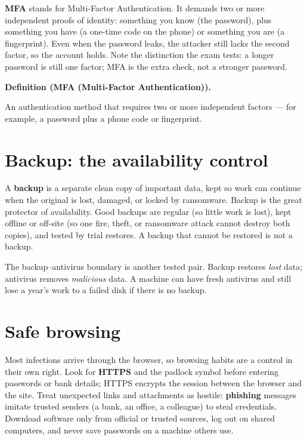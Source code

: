 \documentclass[11pt]{article}
\newenvironment{definitionbox}[1]{%
  \par\noindent\textbf{Definition (#1).}\ \itshape
}{\par\vspace{0.3em}}
\begin{document}
\textbf{MFA} stands for Multi-Factor Authentication. It demands two or more
independent proofs of identity: something you know (the password), plus
something you have (a one-time code on the phone) or something you are (a
fingerprint). Even when the password leaks, the attacker still lacks the
second factor, so the account holds. Note the distinction the exam tests: a
longer password is still one factor; MFA is the extra check, not a stronger
password.

\begin{definitionbox}{MFA (Multi-Factor Authentication)}
An authentication method that requires two or more independent factors ---
for example, a password plus a phone code or fingerprint.
\end{definitionbox}

\section{Backup: the availability control}
A \textbf{backup} is a separate clean copy of important data, kept so work
can continue when the original is lost, damaged, or locked by ransomware.
Backup is the great protector of availability. Good backups are regular (so
little work is lost), kept offline or off-site (so one fire, theft, or
ransomware attack cannot destroy both copies), and tested by trial restores. A
backup that cannot be restored is not a backup.

The backup--antivirus boundary is another tested pair. Backup restores
\emph{lost} data; antivirus removes \emph{malicious} data. A machine can have
fresh antivirus and still lose a year's work to a failed disk if there is no
backup.

\section{Safe browsing}
Most infections arrive through the browser, so browsing habits are a control
in their own right. Look for \textbf{HTTPS} and the padlock symbol before
entering passwords or bank details; HTTPS encrypts the session between the
browser and the site. Treat unexpected links and attachments as hostile:
\textbf{phishing} messages imitate trusted senders (a bank, an office, a
colleague) to steal credentials. Download software only from official or
trusted sources, log out on shared computers, and never save passwords on a
machine others use.
\end{document}
